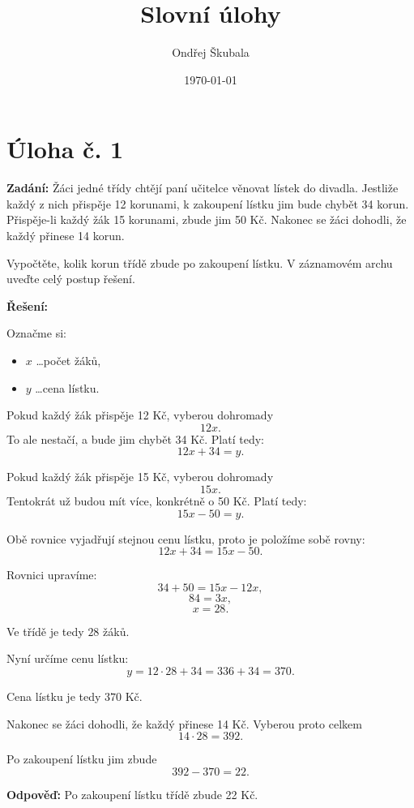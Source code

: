\documentclass[12pt,a4paper]{article}
\title{Slovní úlohy}
\author{Ondřej Škubala}
\date{\today}
\begin{document}
\maketitle


\newpage
\section*{Úloha č. 1}

\textbf{Zadání:}  
Žáci jedné třídy chtějí paní učitelce věnovat lístek do divadla. Jestliže každý z nich přispěje 12 korunami, k zakoupení lístku jim bude chybět 34 korun. Přispěje-li každý žák 15 korunami, zbude jim 50 Kč. Nakonec se žáci dohodli, že každý přinese 14 korun.

Vypočtěte, kolik korun třídě zbude po zakoupení lístku.  
V záznamovém archu uveďte celý postup řešení.

\bigskip

\textbf{Řešení:}

Označme si:
\begin{itemize}
    \item \(x\) \dots počet žáků,
    \item \(y\) \dots cena lístku.
\end{itemize}

Pokud každý žák přispěje 12 Kč, vyberou dohromady
\[
12x.
\]
To ale nestačí, a bude jim chybět 34 Kč. Platí tedy:
\[
12x + 34 = y.
\]

Pokud každý žák přispěje 15 Kč, vyberou dohromady
\[
15x.
\]
Tentokrát už budou mít více, konkrétně o 50 Kč. Platí tedy:
\[
15x - 50 = y.
\]

Obě rovnice vyjadřují stejnou cenu lístku, proto je položíme sobě rovny:
\[
12x + 34 = 15x - 50.
\]

Rovnici upravíme:
\[
34 + 50 = 15x - 12x,
\]
\[
84 = 3x,
\]
\[
x = 28.
\]

Ve třídě je tedy \(28\) žáků.

Nyní určíme cenu lístku:
\[
y = 12 \cdot 28 + 34 = 336 + 34 = 370.
\]

Cena lístku je tedy \(370\) Kč.

Nakonec se žáci dohodli, že každý přinese 14 Kč. Vyberou proto celkem
\[
14 \cdot 28 = 392.
\]

Po zakoupení lístku jim zbude
\[
392 - 370 = 22.
\]

\bigskip

\textbf{Odpověď:}  
Po zakoupení lístku třídě zbude 22 Kč.
\end{document}
